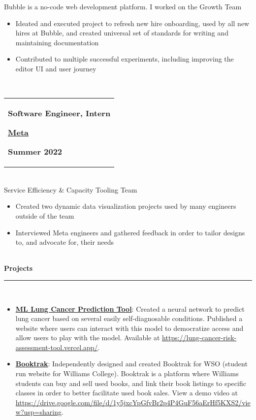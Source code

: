 \documentclass[10pt]{extarticle}
\begin{document}
Bubble is a no-code web development platform. I worked on the Growth Team \\ 
\vspace{-\baselineskip}
\begin{itemize}[itemsep=0pt, topsep=0pt]
\item Ideated and executed project to refresh new hire onboarding, used by all new hires at Bubble, and created universal set of standards for writing and maintaining documentation 
\item Contributed to multiple successful experiments, including improving the editor UI and user journey 
\end{itemize}~\\[-1ex]
\begin{tabular}{@{}p{\textwidth}}\begin{minipage}[t]{0.333\textwidth}
\raggedright
\textbf{Software Engineer, Intern}
\end{minipage}%
\begin{minipage}[t]{0.333\textwidth}
\centering
\textbf{\underline{Meta}}
\end{minipage}%
\begin{minipage}[t]{0.333\textwidth}
\raggedleft
\textbf{Summer 2022}
\end{minipage}%
\end{tabular}\\[0.5ex]
Service Efficiency \& Capacity Tooling Team \\ 
\vspace{-\baselineskip}
\begin{itemize}[itemsep=0pt, topsep=0pt]
\item Created two dynamic data visualization projects used by many engineers outside of the team 
\item Interviewed Meta engineers and gathered feedback in order to tailor designs to, and advocate for, their needs 
\end{itemize}~\\[-1ex]
\textbf{Projects }\\[-2ex]
\rule{\textwidth}{0.4pt}\\ 
\vspace{-\baselineskip}
\begin{itemize}[itemsep=0pt, topsep=0pt]
\item \textbf{\underline{ML Lung Cancer Prediction Tool}}: Created a neural network to predict lung cancer based on several easily self-diagnosable conditions. Published a website where users can interact with this model to democratize access and allow users to play with the model. Available at \url{https://lung-cancer-risk-assessment-tool.vercel.app/}. 
\item \textbf{\underline{Booktrak}}: Independently designed and created Booktrak for WSO (student run website for Williams College). Booktrak is a platform where Williams students can buy and sell used books, and link their book listings to specific classes in order to better facilitate used book sales. View a demo video at \url{https://drive.google.com/file/d/1y5jxcYpGfvBr2p4P4GuF56aErHf5KXS2/view?usp=sharing}. 
\end{itemize}
\end{document}
